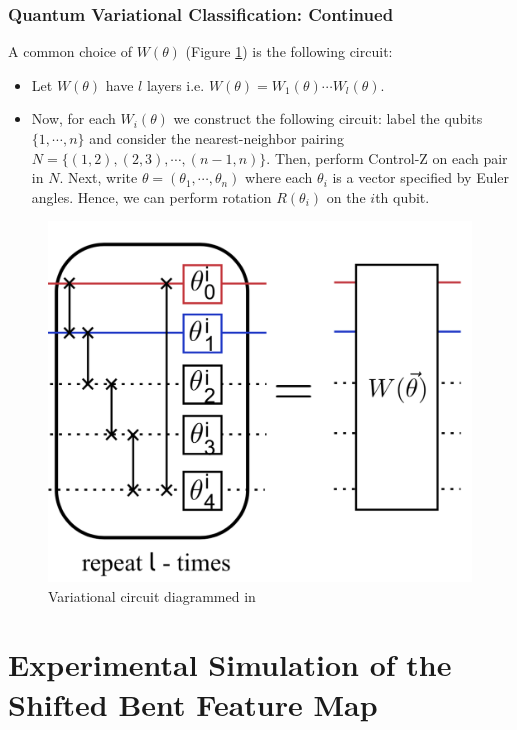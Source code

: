 \documentclass{beamer}
\newcommand\0{\mathbf{0}}
\newcommand\<{\langle}
\renewcommand\>{\rangle}
\begin{document}
\begin{frame}
\frametitle{Quantum Variational Classification: Continued}
A common choice of $W(\theta)$ (Figure \ref{fig:var}) is the following circuit: 

\begin{itemize}
\item Let $W(\theta)$ have $l$ layers i.e. $W(\theta) = W_1(\theta) \cdots W_l(\theta)$. 

\item Now, for each $W_i(\theta)$ we construct the following circuit: label the qubits $\{1, \cdots, n\}$ and consider the nearest-neighbor pairing $N = \{(1,2), (2, 3), \cdots, (n-1, n)\}$. Then, perform Control-Z on each pair in $N$. Next, write $\theta = (\theta_1, \cdots, \theta_n)$ where each $\theta_i$ is a vector specified by Euler angles. Hence, we can perform rotation $R(\theta_i)$ on the $i$th qubit.
\end{itemize}

\begin{figure}
\label{fig:var}
\centering
\includegraphics[width=0.5 \textwidth]{images/variational.png}	
\caption{Variational circuit diagrammed in \cite{havlicek2018supervised}}
\end{figure}
\end{frame}

%
%
%
\section{Experimental Simulation of the Shifted Bent Feature Map}
\end{document}
